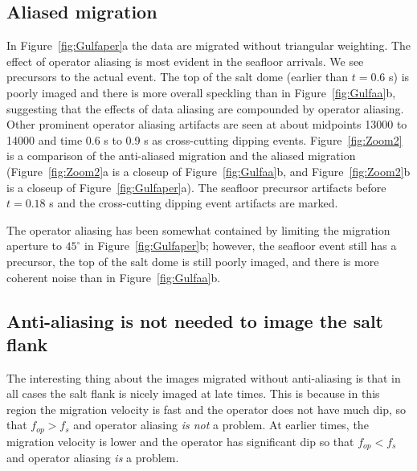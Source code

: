 \subsection{Aliased migration}
In Figure~\ref{fig:Gulfaper}a the data are migrated without triangular weighting.
The effect of operator aliasing is most evident in the seafloor arrivals.
We see precursors to the actual event. The top of 
the salt dome (earlier than $t = 0.6$ s) is poorly imaged and there is more
overall speckling than in Figure~\ref{fig:Gulfaa}b, suggesting that
the effects of data aliasing are compounded by operator aliasing.
Other prominent operator aliasing artifacts are seen at about
midpoints 13000 to 14000 and time 0.6 s to 0.9 s as cross-cutting dipping
events.  
Figure~\ref{fig:Zoom2} is a comparison of the anti-aliased 
migration and the aliased migration 
(Figure~\ref{fig:Zoom2}a is a closeup of Figure~\ref{fig:Gulfaa}b, and
Figure~\ref{fig:Zoom2}b is a closeup of Figure~\ref{fig:Gulfaper}a).
The seafloor precursor artifacts before $t=0.18$ s and the cross-cutting 
dipping event artifacts are marked.

The operator aliasing has been somewhat contained by limiting the
migration aperture to $45^\circ$ in Figure~\ref{fig:Gulfaper}b;
however, the seafloor event still has
a precursor, the top of the salt dome is still poorly imaged, and there 
is more coherent noise than in Figure~\ref{fig:Gulfaa}b.



\subsection{Anti-aliasing is not needed to image the salt flank}
The interesting thing about the images migrated without
anti-aliasing is that in all cases the 
salt flank is nicely imaged at late times. This is because in this region
the migration velocity is fast and the operator does not have much dip, so
that $f_{op} > f_s$ and operator aliasing {\it is not} a problem.  
At earlier times, the migration velocity is lower and the operator has
significant dip so that $f_{op} < f_s$ and operator aliasing {\it is} a problem.

